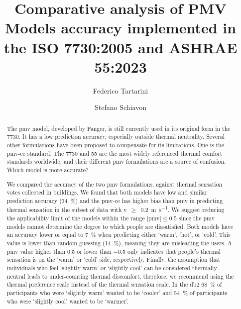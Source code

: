 \begin{frontmatter}

    \title{Comparative analysis of PMV Models accuracy implemented in the ISO 7730:2005 and ASHRAE 55:2023}

    \author[label1]{Federico Tartarini}
    \author[label3]{Stefano Schiavon}

    \address[label1]{School of Architecture, Design, and Planning, The University of Sydney, Sydney, AU}
    \address[label3]{Center for the Built Environment, Department of Architecture, Department of Civil and Environmental Engineering, University of California, Berkeley, CA, USA}


    \begin{abstract}
        The \ac{pmv} model, developed by Fanger, is still currently used in its original form in the \gls{7730}.
        It has a low prediction accuracy, especially outside thermal neutrality.
        Several other formulations have been proposed to compensate for its limitations.
        One is the \ac{pmv-ce} standard.
        The \gls{7730} and \gls{55} are the most widely referenced thermal comfort standards worldwide, and their different \ac{pmv} formulations are a source of confusion.
        Which model is more accurate?

        We compared the accuracy of the two \ac{pmv} formulations, against  thermal sensation votes collected in buildings.
        We found that both models have low and similar prediction accuracy (\qty{34}{\percent}) and the \ac{pmv-ce} has higher bias than \ac{pmv} in predicting thermal sensation in the subset of data with \ac{v}~$\geq$~\qty{0.2}{\m\per\s}.
        We suggest reducing the applicability limit of the models within the range $\mid$\ac{pmv}$\mid \leq 0.5$ since the \ac{pmv} models cannot determine the degree to which people are dissatisfied.
        Both models have an accuracy lower or equal to \qty{7}{\percent} when predicting either `warm', `hot', or `cold'.
        This value is lower than random guessing (\qty{14}{\percent}), meaning they are misleading the users.
        A \ac{pmv} value higher than \num{.5} or lower than \num{-.5} only indicates that people's thermal sensation is on the `warm' or `cold' side, respectively.
        Finally, the assumption that individuals who feel `slightly warm' or `slightly cool' can be considered thermally neutral leads to under-counting thermal discomfort, therefore, we recommend using the thermal preference scale instead of the thermal sensation scale.
        In the \ac{db2} \qty{68}{\percent} of participants who were `slightly warm' wanted to be `cooler' and \qty{54}{\percent} of participants who were `slightly cool' wanted to be `warmer'.
    \end{abstract}


\end{frontmatter}
